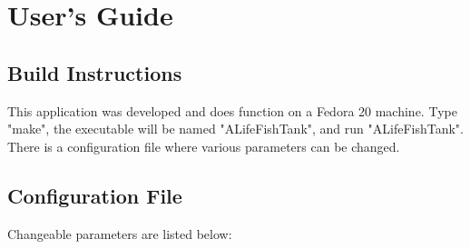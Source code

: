 
\chapter{User's Guide}
\label{chap:user}

\section{Build Instructions}
This application was developed and does function on a Fedora 20 machine. Type "make", the executable will be named "ALifeFishTank", and run "ALifeFishTank". There is a configuration file where various parameters can be changed.

\section{Configuration File}
Changeable parameters are listed below:

